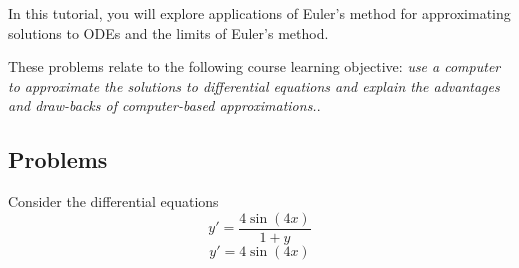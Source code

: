 		\begin{objectives}
			In this tutorial, you will explore applications of Euler's method for approximating solutions to ODEs
			and the limits of Euler's method.

			These problems relate to the following course learning
			objective: \textit{use a computer to approximate the solutions to differential equations 
			and explain the advantages and draw-backs of computer-based approximations.}.
		\end{objectives}



		\subsection*{Problems}
		
		Consider the differential equations
		\begin{equation}
			\label{tut1-ode}
			y'=\frac{4\sin(4x)}{1+y}
		\end{equation}
		\begin{equation}
			\label{tut1-ode2}
			y'=4\sin(4x)
		\end{equation}

